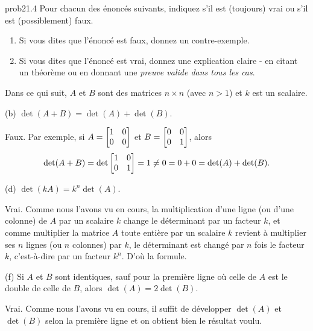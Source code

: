 \bigskip
\begin{sol}{prob21.4}  Pour chacun des énoncés suivants, indiquez s'il est (toujours) vrai ou s'il est (possiblement) faux.   
\begin{enumerate}[$\bullet$]
\item Si vous dites que l'\'enonc\'e est faux, donnez un contre-exemple.   
\item Si vous dites que l'\'enonc\'e est vrai, donnez une explication claire - en citant un théorème ou en donnant une {\it preuve valide dans tous les cas}. 
\end{enumerate}

\medskip  Dans ce qui suit, $A$ et $B$ sont des matrices $n \times n$ (avec $n>1$) et $k$ est un scalaire.

\medskip

(b) $\det (A +B) = \det(A) +\det(B)$.

\soln Faux. Par exemple, si $A=\bmatrix 1&0\cr0&0\endbmatrix$ et $B=\bmatrix 0&0\cr0&1\endbmatrix$, alors $$\det(A+B)=\det \bmatrix 1&0\cr0&1\endbmatrix =1 \not= 0=0+0= \det(A) + \det(B).$$ 
\medskip

(d) $\det (k A)= k^n \det(A)$.

\soln Vrai. Comme nous l'avons vu en cours, la multiplication d'une ligne (ou d'une colonne) de $A$ par un scalaire $k$ change le déterminant par un facteur $k$, et comme multiplier la matrice $A$ toute entière par un scalaire $k$ revient à multiplier ses $n$ lignes (ou $n$ colonnes) par $k$,  le déterminant est changé par $n$ fois le facteur $k$, c'est-à-dire par un facteur $k^n$. D'où la formule.
\medskip


(f) Si $A$ et $B$ sont identiques, sauf pour la première ligne o\`u celle de $A$ est le double de celle de $B$, alors $\det(A)=2 \det(B)$.

\soln Vrai. Comme nous l'avons vu en cours, il suffit de développer $\det(A)$ et $\det(B)$ selon la première ligne et on obtient bien le résultat voulu.
\medskip

\end{sol}

